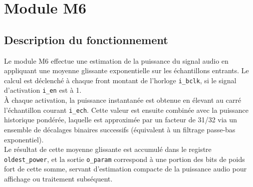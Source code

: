 \section{Module M6}





\subsection{Description du fonctionnement}

Le module M6 effectue une estimation de la puissance du signal audio en
appliquant une moyenne glissante exponentielle sur les échantillons entrants.
Le calcul est déclenché à chaque front montant de l'horloge \verb|i_bclk|, si
le signal d'activation \verb|i_en| est à 1.\\

À chaque activation, la puissance instantanée est obtenue en élevant au carré
l'échantillon courant \verb|i_ech|. Cette valeur est ensuite combinée avec la
puissance historique pondérée, laquelle est approximée par un facteur de
31/32 via un ensemble de décalages binaires successifs (équivalent à un
filtrage passe-bas exponentiel).\\

Le résultat de cette moyenne glissante est accumulé dans le registre
\verb|oldest_power|, et la sortie \verb|o_param| correspond à une portion des
bits de poids fort de cette somme, servant d'estimation compacte de la
puissance audio pour affichage ou traitement subséquent.\\


